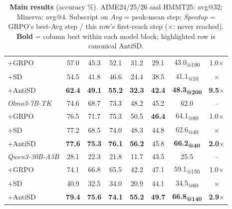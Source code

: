 \documentclass{llmxive}
\begin{document}
\begin{table}[ht]
\begin{tabular}{l|c c c c c|c|c}
    \quad +GRPO                        & 57.0            & 45.3            & 52.1            & 31.2            & 29.1             & 43.0\textsubscript{@190}          & 1.0$\times$           \\
    \quad +SD                          & 54.5            & 41.8            & 46.6            & 24.4            & 38.5             & 41.1\textsubscript{@10}           & $\times$              \\
    \rowcolor{antisdrow} \quad +AntiSD & \textbf{62.4}   & \textbf{49.1}   & \textbf{55.2}   & \textbf{32.3}   & \textbf{42.4}    & \textbf{48.3\textsubscript{@200}} & \textbf{9.5$\times$}  \\
    \midrule
    \textit{Olmo3-7B-TK}               & 74.6            & 68.7            & 73.3            & 48.2            & 45.2             & 62.0                              & --                    \\
    \quad +GRPO                        & 76.5            & 71.7            & 75.3            & 50.5            & \textbf{46.4}    & 64.1\textsubscript{@80}           & 1.0$\times$           \\
    \quad +SD                          & 77.2            & 68.5            & 74.0            & 48.3            & 44.8             & 62.6\textsubscript{@40}           & $\times$              \\
    \rowcolor{antisdrow} \quad +AntiSD & \textbf{77.6}   & \textbf{75.3}   & \textbf{76.1}   & \textbf{56.2}   & 45.8             & \textbf{66.2\textsubscript{@40}}  & \textbf{2.0$\times$}  \\
    \midrule
    \textit{Qwen3-30B-A3B}             & 28.1            & 22.3            & 21.8            & 11.7            & 43.5             & 25.5                              & --                    \\
    \quad +GRPO                        & 74.1            & 66.8            & 65.5            & 42.2            & 47.1             & 59.1\textsubscript{@150}          & 1.0$\times$           \\
    \quad +SD                          & 40.9            & 32.5            & 34.0            & 20.9            & 44.1             & 34.5\textsubscript{@60}           & $\times$              \\
    \rowcolor{antisdrow} \quad +AntiSD & \textbf{79.4}   & \textbf{75.6}   & \textbf{74.1}   & \textbf{55.2}   & \textbf{49.7}    & \textbf{66.8\textsubscript{@140}} & \textbf{2.9$\times$}  \\
    \bottomrule
  \end{tabular}
\caption{\textbf{Main results} (accuracy \%). AIME24/25/26 and HMMT25: avg@$32$; Minerva: avg@$4$. Subscript on \emph{Avg} = peak-mean step; \emph{Speedup} = GRPO's best-Avg step / this row's first-reach step ($\times$: never reached). \textbf{Bold} = column best within each model block; highlighted row is canonical AntiSD.}
\end{table}
\end{document}
